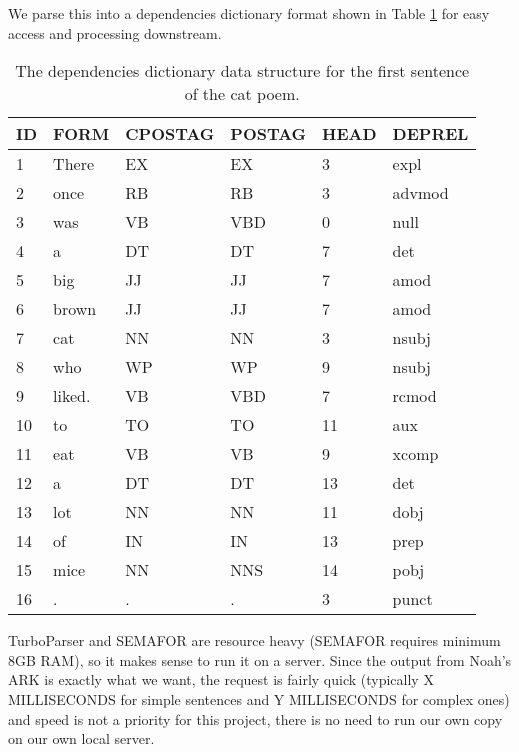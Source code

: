 We parse this into a dependencies dictionary format shown in Table \ref{tab:DepDict} for easy access and processing downstream.

\begin{table}
\centering
    \begin{tabular}{|l|l|l|l|l|l|}
    \hline
    ID & FORM   & CPOSTAG & POSTAG & HEAD & DEPREL \\ \hline
    1  & There  & EX      & EX     & 3    & expl   \\
    2  & once   & RB      & RB     & 3    & advmod \\
    3  & was    & VB      & VBD    & 0    & null   \\
    4  & a      & DT      & DT     & 7    & det    \\
    5  & big    & JJ      & JJ     & 7    & amod   \\
    6  & brown  & JJ      & JJ     & 7    & amod   \\
    7  & cat    & NN      & NN     & 3    & nsubj  \\
    8  & who    & WP      & WP     & 9    & nsubj  \\
    9  & liked. & VB      & VBD    & 7    & rcmod  \\
    10 & to     & TO      & TO     & 11   & aux    \\
    11 & eat    & VB      & VB     & 9    & xcomp  \\
    12 & a      & DT      & DT     & 13   & det    \\
    13 & lot    & NN      & NN     & 11   & dobj   \\
    14 & of     & IN      & IN     & 13   & prep   \\
    15 & mice   & NN      & NNS    & 14   & pobj   \\
    16 & .      & .       & .      & 3    & punct  \\ \hline
    \end{tabular}
\caption{The dependencies dictionary data structure for the first sentence of the cat poem.}
\label{tab:DepDict}
\end{table}

TurboParser and SEMAFOR are resource heavy (SEMAFOR requires minimum 8GB RAM), so it makes sense to run it on a server. Since the output from Noah's ARK is exactly what we want, the request is fairly quick (typically X MILLISECONDS for simple sentences and Y MILLISECONDS for complex ones) and speed is not a priority for this project, there is no need to run our own copy on our own local server.

